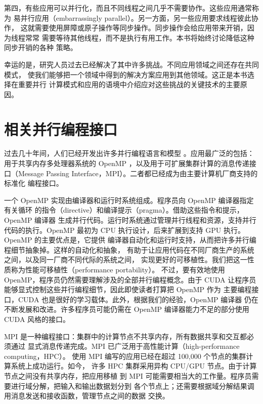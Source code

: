第四，有些应用可以并行化，而且不同线程之间几乎不需要协作。这些应用通常称为
易并行应用（embarrassingly parallel）。另一方面，另一些应用要求线程彼此协作，
这就需要使用屏障或原子操作等同步操作。同步操作会给应用带来开销，因为线程常常
需要等待其他线程，而不是执行有用工作。本书将始终讨论降低这种同步开销的各种
策略。

幸运的是，研究人员过去已经解决了其中许多挑战。不同应用领域之间还存在共同模式，
使我们能够把一个领域中得到的解决方案应用到其他领域。这正是本书选择在重要并行
计算模式和应用的语境中介绍应对这些挑战的关键技术的主要原因。

\section{相关并行编程接口}
\label{sec:related-parallel-interfaces}

过去几十年间，人们已经开发出许多并行编程语言和模型
\cite{mattson2004}。应用最广泛的包括：用于共享内存多处理器系统的 OpenMP
\cite{openmp2025}，以及用于可扩展集群计算的消息传递接口（Message Passing
Interface，MPI）\cite{mpi1994}。二者都已经成为由主要计算机厂商支持的标准化
编程接口。

一个 OpenMP 实现由编译器和运行时系统组成。程序员向 OpenMP 编译器指定有关循环
的指令（directive）和编译提示（pragma）。借助这些指令和提示，OpenMP 编译器
生成并行代码。运行时系统通过管理并行线程和资源，支持并行代码的执行。OpenMP
最初为 CPU 执行设计，后来扩展到支持 GPU 执行。OpenMP 的主要优点是，它提供
编译器自动化和运行时支持，从而把许多并行编程细节抽象掉。这样的自动化和抽象，
有助于让应用代码在不同厂商生产的系统之间，以及同一厂商不同代际的系统之间，
实现更好的可移植性。我们把这一性质称为性能可移植性（performance portability）。
不过，要有效地使用 OpenMP，程序员仍然需要理解涉及的全部并行编程概念。由于
CUDA 让程序员能够显式控制这些并行编程细节，因此即使读者打算把 OpenMP 作为
主要编程接口，CUDA 也是很好的学习载体。此外，根据我们的经验，OpenMP 编译器
仍在不断发展和改进。许多程序员可能仍需在 OpenMP 编译器能力不足的部分使用
CUDA 风格的接口。

MPI 是一种编程接口：集群中的计算节点不共享内存，所有数据共享和交互都必须通过
显式消息传递完成。MPI 已广泛用于高性能计算（high-performance computing，HPC）。
使用 MPI 编写的应用已经在超过 100,000 个节点的集群计算系统上成功运行。如今，
许多 HPC 集群采用异构 CPU/GPU 节点。由于计算节点之间没有共享内存，把应用移植
到 MPI 可能需要相当大的工作量。程序员需要进行域分解，把输入和输出数据划分到
各个节点上；还需要根据域分解结果调用消息发送和接收函数，管理节点之间的数据
交换。

